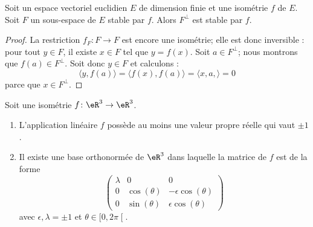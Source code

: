 \begin{lemma}        \label{LEMooNEDQooNRmASH}
    Soit un espace vectoriel euclidien \( E\) de dimension finie et une isométrie \( f\) de \( E\). Soit \( F\) un sous-espace de \( E\) stable par \( f\). Alors \( F^{\perp}\) est stable par \( f\).
\end{lemma}

\begin{proof}
    La restriction \( f_F\colon F\to F\) est encore une isométrie; elle est donc inversible : pour tout $y\in F$, il existe \( x\in F\) tel que \( y=f(x)\). Soit \( a\in F^{\perp}\); nous montrons que \( f(a)\in F^{\perp}\). Soit donc \( y\in F\) et calculons :
    \begin{equation}
        \langle y, f(a)\rangle =\langle f(x), f(a)\rangle =\langle x,a, \rangle =0
    \end{equation}
    parce que \( x\in F^{\perp}\).
\end{proof}

\begin{proposition}      \label{PROPooOMORooWzsrDB}
    Soit une isométrie \( f\colon \eR^3\to \eR^3\).
    \begin{enumerate}
        \item
            L'application linéaire \( f\) possède au moins une valeur propre réelle qui vaut \( \pm 1\).
        \item
            Il existe une base orthonormée de \( \eR^3\) dans laquelle la matrice de \( f\) est de la forme
            \begin{equation}
                \begin{pmatrix}
                    \lambda    &   0    &   0    \\
                    0    &   \cos(\theta)    &   -\epsilon\cos(\theta)    \\
                    0    &   \sin(\theta)    &   \epsilon\cos(\theta)
                \end{pmatrix}
            \end{equation}
            avec \( \epsilon,\lambda=\pm 1\) et \( \theta\in \mathopen[ 0 , 2\pi \mathclose[\).
    \end{enumerate}
\end{proposition}


